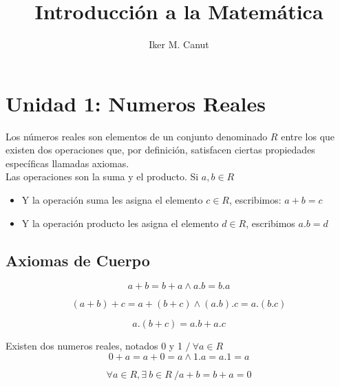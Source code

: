 \documentclass[10pt]{article}
\author{Iker M. Canut}
\begin{document}
\title{Introducción a la Matemática}
\maketitle
\date
\newpage

\tableofcontents
\newpage

\section{Unidad 1: Numeros Reales}
Los números reales son elementos de un conjunto denominado $R$ entre los que existen dos operaciones que, por definición, satisfacen ciertas propiedades específicas llamadas axiomas.\\ Las operaciones son la suma y el producto. Si $a,b \in R$
\begin{itemize}
\item Y la operación suma les asigna el elemento $c \in R$, escribimos: $a+b=c$
\item Y la operación producto les asigna el elemento $d \in R$, escribimos $a.b=d$
\end{itemize}


\subsection{Axiomas de Cuerpo}
\begin{axiom}{}
$$a+b=b+a \land a.b=b.a$$
\end{axiom}

\begin{axiom}{}
$$(a+b)+c=a+(b+c) \land (a.b).c=a.(b.c)$$
\end{axiom}

\begin{axiom}{}
$$a.(b+c)=a.b+a.c$$
\end{axiom}

\begin{axiom}{}
Existen dos numeros reales, notados 0 y 1 $/\ \forall a \in R$
$$0+a = a+0 = a \land 1.a = a.1 = a$$
\end{axiom}

\begin{axiom}{}
$$\forall a \in R, \exists\ b \in R\ / a+b = b+a = 0$$
\end{axiom}
\end{document}
